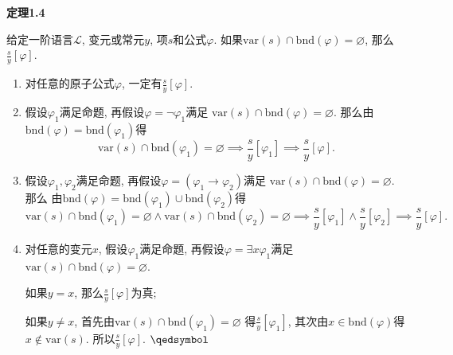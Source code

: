 \documentclass[UTF8]{ctexart}
\begin{document}
\vspace{10pt}



\hypertarget{sec:定理1.4}{}
\noindent\textbf{定理1.4}

给定一阶语言$\mathcal{L}$, 变元或常元$y$, 项$s$和公式$\varphi$.
如果$\mathrm{var}(s)\cap\mathrm{bnd}(\varphi)=\varnothing$,
那么$\displaystyle\frac{s}{y}[\varphi]$.


\begin{enumerate}
    \item 对任意的原子公式$\varphi$, 一定有$\displaystyle\frac{s}{y}[\varphi]$.
    
    \vspace{3pt}
    \item 假设$\varphi_1$满足命题, 再假设$\varphi=\neg\varphi_1$满足
    $\mathrm{var}(s)\cap\mathrm{bnd}(\varphi)=\varnothing$.
    那么由$\mathrm{bnd}(\varphi)=\mathrm{bnd}(\varphi_1)$得
    \vspace{3pt}
    \[
        \mathrm{var}(s)\cap\mathrm{bnd}(\varphi_1)=\varnothing\implies
        \frac{s}{y}[\varphi_1]\implies\frac{s}{y}[\varphi].
    \]

    \vspace{3pt}
    \item 假设$\varphi_1,\varphi_2$满足命题,
    再假设$\varphi=(\varphi_1\to\varphi_2)$满足
    $\mathrm{var}(s)\cap\mathrm{bnd}(\varphi)=\varnothing$. 那么
    由$\mathrm{bnd}(\varphi)=\mathrm{bnd}(\varphi_1)\cup\mathrm{bnd}(\varphi_2)$得
    \vspace{3pt}
    \[
        \mathrm{var}(s)\cap\mathrm{bnd}(\varphi_1)=\varnothing\land
        \mathrm{var}(s)\cap\mathrm{bnd}(\varphi_2)=\varnothing\implies
        \frac{s}{y}[\varphi_1]\land\frac{s}{y}[\varphi_2]\implies
        \frac{s}{y}[\varphi].
    \]

    \item 对任意的变元$x$, 假设$\varphi_1$满足命题,
    再假设$\varphi=\exists x\varphi_1$满足
    $\mathrm{var}(s)\cap\mathrm{bnd}(\varphi)=\varnothing$.
    
    \vspace{3pt}\hspace{2.17em}
    如果$y=x$, 那么$\displaystyle\frac{s}{y}[\varphi]$为真;

    \vspace{3pt}\hspace{2.17em}
    如果$y\neq x$, 首先由$\mathrm{var}(s)\cap\mathrm{bnd}(\varphi_1)=\varnothing$
    得$\displaystyle\frac{s}{y}[\varphi_1]$, 其次由$x\in\mathrm{bnd}(\varphi)$得
    $x\notin\mathrm{var}(s)$. 所以$\displaystyle\frac{s}{y}[\varphi]$.
    \hfill $\qedsymbol$
\end{enumerate}
\end{document}
